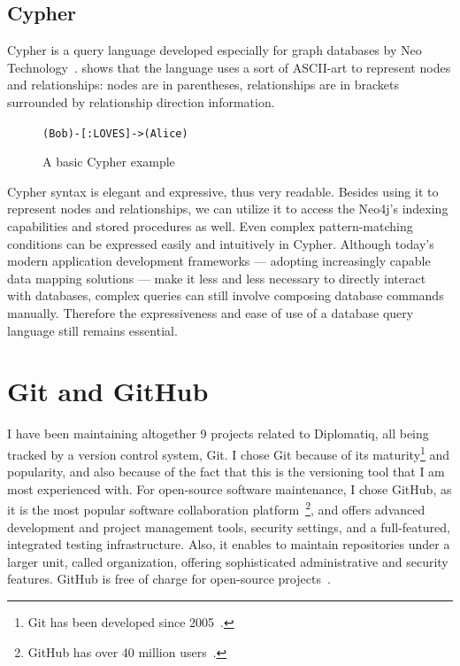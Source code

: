 \subsection{Cypher}

Cypher is a query language developed especially for graph databases by Neo Technology~\cite{neo4j-cypher}.  shows that the language uses a sort of ASCII-art to represent nodes and relationships: nodes are in parentheses, relationships are in brackets surrounded by relationship direction information.

\begin{figure}[!htb]
    \centering
    \lstinline{(Bob)-[:LOVES]->(Alice)}
    \caption{A basic Cypher example}
    \label{fig:cypher-intro}
\end{figure}

Cypher syntax is elegant and expressive, thus very readable. Besides using it to represent nodes and relationships, we can utilize it to access the Neo4j's indexing capabilities and stored procedures as well. Even complex pattern-matching conditions can be expressed easily and intuitively in Cypher. Although today's modern application development frameworks — adopting increasingly capable data mapping solutions — make it less and less necessary to directly interact with databases, complex queries can still involve composing database commands manually. Therefore the expressiveness and ease of use of a database query language still remains essential.

\section{Git and GitHub}

I have been maintaining altogether 9 projects related to Diplomatiq, all being tracked by a version control system, Git. I chose Git because of its maturity\footnote{Git has been developed since 2005~\cite{git-initial-commit}.} and popularity, and also because of the fact that this is the versioning tool that I am most experienced with. For open-source software maintenance, I chose GitHub, as it is the most popular software collaboration platform~\footnote{GitHub has over 40 million users~\cite{github-user-count}.}, and offers advanced development and project management tools, security settings, and a full-featured, integrated testing infrastructure. Also, it enables to maintain repositories under a larger unit, called organization, offering sophisticated administrative and security features. GitHub is free of charge for open-source projects~\cite{github-pricing}.

